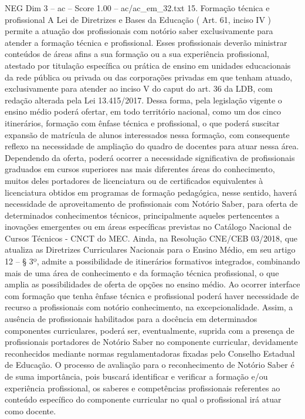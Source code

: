 \begin{textsample}{NEG Dim 3 – ac – Score 1.00 – ac/ac\_em\_32.txt}  \label{ex:f3_neg_263}
15.
Formação técnica e profissional A Lei de Diretrizes e Bases da Educação ( Art. 61, inciso IV ) permite a atuação dos profissionais com notório saber exclusivamente para atender a formação técnica e profissional.
Esses profissionais deverão ministrar conteúdos de áreas afins a sua formação ou a sua experiência profissional, atestado por titulação específica ou prática de ensino em unidades educacionais da rede pública ou privada ou das corporações privadas em que tenham atuado, exclusivamente para atender ao inciso V do caput do art. 36 da LDB, com redação alterada pela Lei 13.415/2017.
Dessa forma, pela legislação vigente o ensino médio poderá ofertar, em todo território nacional, como um dos cinco itinerários, formação com ênfase técnica e profissional, o que poderá suscitar expansão de matrícula de alunos interessados nessa formação, com consequente reflexo na necessidade de ampliação do quadro de docentes para atuar nessa área.
Dependendo da oferta, poderá ocorrer a necessidade significativa de profissionais graduados em cursos superiores nas mais diferentes áreas do conhecimento, muitos deles portadores de licenciatura ou de certificados equivalentes à licenciatura obtidos em programas de formação pedagógica, nesse sentido, haverá necessidade de aproveitamento de profissionais com Notório Saber, para oferta de determinados conhecimentos técnicos, principalmente aqueles pertencentes a inovações emergentes ou em áreas específicas previstas no Catálogo Nacional de Cursos Técnicos - CNCT do MEC.
Ainda, na Resolução CNE/CEB 03/2018, que atualiza as Diretrizes Curriculares Nacionais para o Ensino Médio, em seu artigo 12 – § 3º, admite a possibilidade de itinerários formativos integrados, combinando mais de uma área de conhecimento e da formação técnica profissional, o que amplia as possibilidades de oferta de opções no ensino médio.
Ao ocorrer interface com formação que tenha ênfase técnica e profissional poderá haver necessidade de recurso a profissionais com notório conhecimento, na excepcionalidade.
Assim, a ausência de profissionais habilitados para a docência em determinados componentes curriculares, poderá ser, eventualmente, suprida com a presença de profissionais portadores de Notório Saber no componente curricular, devidamente reconhecidos mediante normas regulamentadoras fixadas pelo Conselho Estadual de Educação.
O processo de avaliação para o reconhecimento de Notório Saber é de suma importância, pois buscará identificar e verificar a formação e/ou experiência profissional, os saberes e competências profissionais referentes ao conteúdo específico do componente curricular no qual o profissional irá atuar como docente.

\end{textsample}
